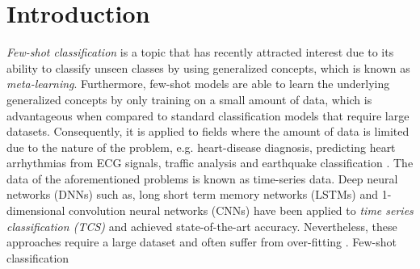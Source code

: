 \documentclass[../../main.tex]{subfiles}
\begin{document}
\footnotesize
\section{Introduction}

\textit{Few-shot classification} is a topic that has recently attracted interest due to its ability to classify unseen classes by using generalized concepts, which is known as \textit{meta-learning}. Furthermore, few-shot models are able to learn the underlying generalized concepts by only training on a small amount of data, which is advantageous when compared to standard classification models that require large datasets. Consequently, it is applied to fields where the amount of data is limited due to the nature of the problem, e.g. heart-disease diagnosis, predicting heart arrhythmias from ECG signals, traffic analysis and earthquake classification \cite{inpr_DBLP2020, narwariya2020}. 
The data of the aforementioned problems is known as time-series data. Deep neural networks (DNNs) such as, long short term memory networks (LSTMs) and 1-dimensional convolution neural networks (CNNs) have been applied to \textit{time series classification (TCS)} and achieved state-of-the-art accuracy. Nevertheless, these approaches require a large dataset and often suffer from over-fitting \cite{narwariya2020}. 
Few-shot classification

    

\end{document}
